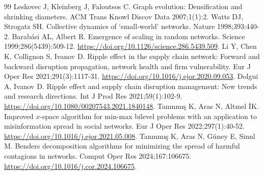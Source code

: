\documentclass[preprint,11pt]{elsarticle}
\theoremstyle{definition}
\theoremstyle{remark}
\begin{document}
\begin{thebibliography}{99}
Leskovec J, Kleinberg J, Faloutsos C. Graph evolution: Densification and shrinking diameters. ACM Trans Knowl Discov Data 2007;1(1):2.
Watts DJ, Strogatz SH. Collective dynamics of `small-world' networks. Nature 1998;393:440-2.
Barabási AL, Albert R. Emergence of scaling in random networks. Science 1999;286(5439):509-12. \url{https://doi.org/10.1126/science.286.5439.509}.
Li Y, Chen K, Collignon S, Ivanov D. Ripple effect in the supply chain network: Forward and backward disruption propagation, network health and firm vulnerability. Eur J Oper Res 2021;291(3):1117-31. \url{https://doi.org/10.1016/j.ejor.2020.09.053}.
Dolgui A, Ivanov D. Ripple effect and supply chain disruption management: New trends and research directions. Int J Prod Res 2021;59(1):102-9. \url{https://doi.org/10.1080/00207543.2021.1840148}.
Tanınmış K, Aras N, Altınel İK. Improved $x$-space algorithm for min-max bilevel problems with an application to misinformation spread in social networks. Eur J Oper Res 2022;297(1):40-52. \url{https://doi.org/10.1016/j.ejor.2021.05.008}.
Tanınmış K, Aras N, Güney E, Sinnl M. Benders decomposition algorithms for minimizing the spread of harmful contagions in networks. Comput Oper Res 2024;167:106675. \url{https://doi.org/10.1016/j.cor.2024.106675}.

\end{thebibliography}
\end{document}
